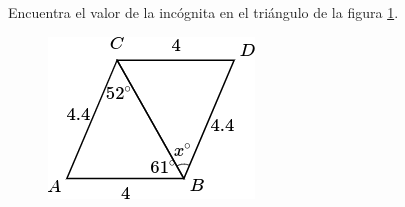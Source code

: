 Encuentra el valor de la incógnita en el triángulo de la figura \ref{fig:angle_triangle_03}.

\begin{minipage}[t][][t]{0.35\textwidth}
    \begin{figure}[H]
        \centering
        \includegraphics[width=0.9\linewidth]{../images/angle_triangle_03.png}

        \caption{}
        \label{fig:angle_triangle_03}
    \end{figure}
\end{minipage}\hfill
\begin{minipage}[t][][t]{0.6\textwidth}
    \begin{solutionbox}{4.5cm}

    \end{solutionbox}
\end{minipage}

